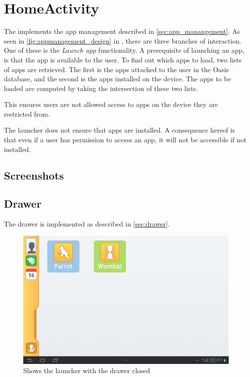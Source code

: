 \section{HomeActivity}
The  implements the app management described in \autoref{sec:app_manangement}. 
As seen in \autoref{fig:appmanagement_design} in , there are three branches of interaction. 
One of these is the \emph{Launch app} functionality.
A prerequisite of launching an app, is that the app is available to the user. 
To find out which apps to load, two lists of apps are retrieved. 
The first is the apps attached to the user in the Oasis database, and the second is the apps installed on the device.
The apps to be loaded are computed by taking the intersection of these two lists.

This ensures users are not allowed access to apps on the device they are restricted from.

The launcher does not ensure that apps are installed. 
A consequence hereof is that even if a user has permission to access an app, it will not be accessible if not installed.

\subsection{Screenshots}




\subsection{Drawer}
The drawer is implemented as described in \autoref{sec:drawer}.


\begin{figure}[h!]
	\centering
	\includegraphics[scale=0.2]{gfx/home-activity_closed}
	\caption{Shows the launcher with the drawer closed}
	\label{fig:home-activity_closed}
\end{figure}

